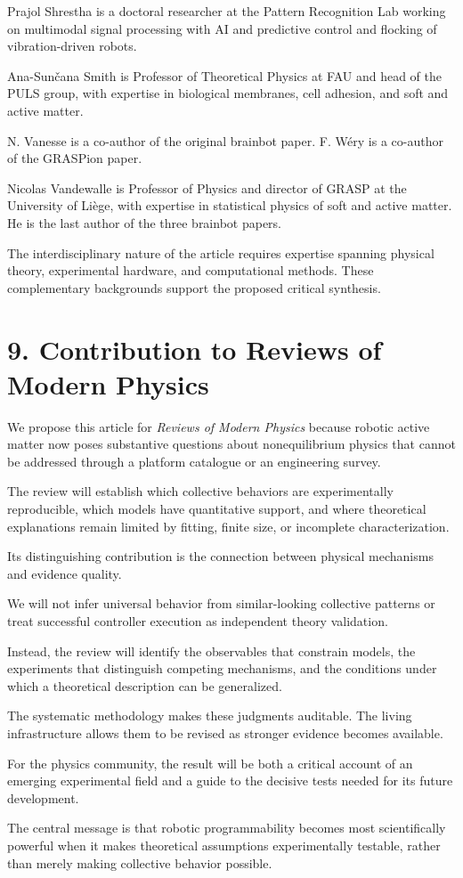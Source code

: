 Prajol Shrestha is a doctoral researcher
at the Pattern Recognition Lab working
on multimodal signal processing with AI
and predictive control and flocking
of vibration-driven robots.

Ana-Sun\v{c}ana Smith is Professor
of Theoretical Physics at FAU and head
of the PULS group, with expertise
in biological membranes, cell adhesion,
and soft and active matter.

N. Vanesse is a co-author of the
original brainbot paper. F. W\'ery
is a co-author of the GRASPion paper.

Nicolas Vandewalle is Professor of Physics
and director of GRASP at the University
of Li\`ege, with expertise in statistical
physics of soft and active matter.
He is the last author of the
three brainbot papers.

The interdisciplinary nature of the
article requires expertise spanning
physical theory, experimental hardware,
and computational methods. These
complementary backgrounds support
the proposed critical synthesis.

\section*{9. Contribution to Reviews of Modern Physics}

We propose this article for
\textit{Reviews of Modern Physics}
because robotic active matter now
poses substantive questions about
nonequilibrium physics that cannot
be addressed through a platform
catalogue or an engineering survey.

The review will establish which
collective behaviors are experimentally
reproducible, which models have
quantitative support, and where
theoretical explanations remain
limited by fitting, finite size,
or incomplete characterization.

Its distinguishing contribution
is the connection between
physical mechanisms and
evidence quality.

We will not infer universal
behavior from similar-looking
collective patterns or treat
successful controller execution
as independent theory validation.

Instead, the review will
identify the observables
that constrain models,
the experiments that
distinguish competing
mechanisms, and the
conditions under which
a theoretical description
can be generalized.

The systematic methodology
makes these judgments
auditable. The living
infrastructure allows
them to be revised
as stronger evidence
becomes available.

For the physics community,
the result will be both
a critical account of
an emerging experimental
field and a guide to
the decisive tests
needed for its future
development.

The central message
is that robotic
programmability becomes
most scientifically
powerful when it
makes theoretical
assumptions experimentally
testable, rather than
merely making collective
behavior possible.
